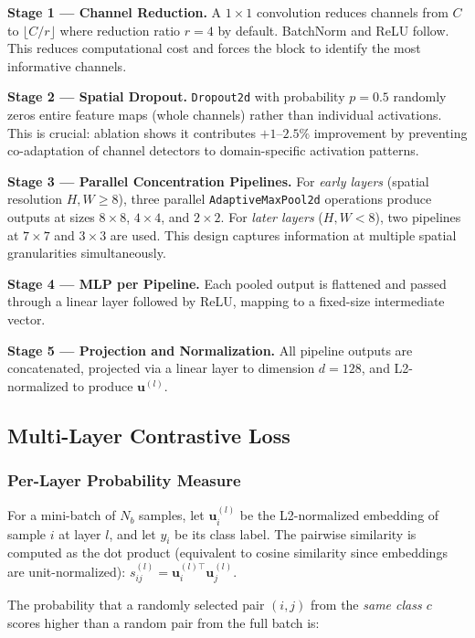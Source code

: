 \documentclass[12pt,a4paper]{article}
\begin{document}
\textbf{Stage 1 — Channel Reduction.}
A $1{\times}1$ convolution reduces channels from $C$ to $\lfloor C/r \rfloor$ where
reduction ratio $r{=}4$ by default. BatchNorm and ReLU follow.
This reduces computational cost and forces the block to identify the most informative channels.

\textbf{Stage 2 — Spatial Dropout.}
\texttt{Dropout2d} with probability $p{=}0.5$ randomly zeros entire feature maps
(whole channels) rather than individual activations. This is crucial: ablation shows
it contributes $+1$–$2.5\%$ improvement by preventing co-adaptation of channel
detectors to domain-specific activation patterns.

\textbf{Stage 3 — Parallel Concentration Pipelines.}
For \emph{early layers} (spatial resolution $H,W \geq 8$), three parallel
\texttt{AdaptiveMaxPool2d} operations produce outputs at sizes $8{\times}8$, $4{\times}4$,
and $2{\times}2$. For \emph{later layers} ($H,W < 8$), two pipelines at $7{\times}7$ and
$3{\times}3$ are used. This design captures information at multiple spatial granularities
simultaneously.

\textbf{Stage 4 — MLP per Pipeline.}
Each pooled output is flattened and passed through a linear layer followed by ReLU,
mapping to a fixed-size intermediate vector.

\textbf{Stage 5 — Projection and Normalization.}
All pipeline outputs are concatenated, projected via a linear layer to dimension
$d{=}128$, and L2-normalized to produce $\mathbf{u}^{(l)}$.

\subsection{Multi-Layer Contrastive Loss}

\subsubsection{Per-Layer Probability Measure}

For a mini-batch of $N_b$ samples, let $\mathbf{u}_i^{(l)}$ be the L2-normalized
embedding of sample $i$ at layer $l$, and let $y_i$ be its class label.
The pairwise similarity is computed as the dot product (equivalent to cosine similarity
since embeddings are unit-normalized):
$s_{ij}^{(l)} = \mathbf{u}_i^{(l)\top} \mathbf{u}_j^{(l)}$.

The probability that a randomly selected pair $(i,j)$ from the \emph{same class $c$}
scores higher than a random pair from the full batch is:
\end{document}
